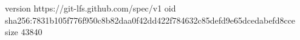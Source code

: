 version https://git-lfs.github.com/spec/v1
oid sha256:7831b105f776f950c8b82daa0f42dd422f784632c85defd9e65dcedabefd8cce
size 43840
